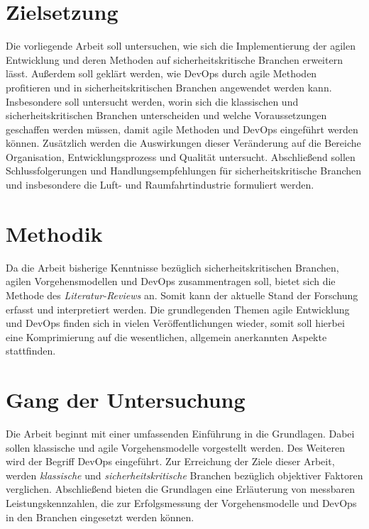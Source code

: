 \section{Zielsetzung}

Die vorliegende Arbeit soll untersuchen, wie sich die Implementierung der agilen Entwicklung und deren Methoden auf sicherheitskritische Branchen erweitern lässt.
Außerdem soll geklärt werden, wie DevOps durch agile Methoden profitieren und in sicherheitskritischen Branchen angewendet werden kann.
Insbesondere soll untersucht werden, worin sich die klassischen und sicherheitskritischen Branchen unterscheiden und welche Voraussetzungen geschaffen werden müssen, damit agile Methoden und DevOps eingeführt werden können.
Zusätzlich werden die Auswirkungen dieser Veränderung auf die Bereiche Organisation, Entwicklungsprozess und Qualität untersucht.
Abschließend sollen Schlussfolgerungen und Handlungsempfehlungen für sicherheitskritische Branchen und insbesondere die Luft- und Raumfahrtindustrie formuliert werden.


\section{Methodik}

Da die Arbeit bisherige Kenntnisse bezüglich sicherheitskritischen Branchen, agilen Vorgehensmodellen und DevOps zusammentragen soll, bietet sich die Methode des \emph{Literatur-Reviews} \parencite[vgl.][]{Fettke:2006aa} an.
Somit kann der aktuelle Stand der Forschung erfasst und interpretiert werden.
Die grundlegenden Themen agile Entwicklung und DevOps finden sich in vielen Veröffentlichungen wieder, somit soll hierbei eine Komprimierung auf die wesentlichen, allgemein anerkannten Aspekte stattfinden.

\section{Gang der Untersuchung}

Die Arbeit beginnt mit einer umfassenden Einführung in die Grundlagen.
Dabei sollen klassische und agile Vorgehensmodelle vorgestellt werden.
Des Weiteren wird der Begriff DevOps eingeführt.
Zur Erreichung der Ziele dieser Arbeit, werden \emph{klassische} und \emph{sicherheitskritische} Branchen bezüglich objektiver Faktoren verglichen.
Abschließend bieten die Grundlagen eine Erläuterung von messbaren Leistungskennzahlen, die zur Erfolgsmessung der Vorgehensmodelle und DevOps in den Branchen eingesetzt werden können.

